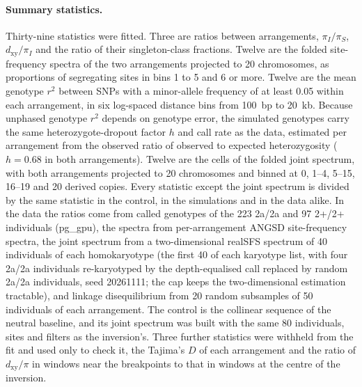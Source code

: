 \documentclass[11pt]{article}
\newcommand{\dxy}{d_\mathrm{xy}}
\begin{document}
\paragraph{Summary statistics.}
Thirty-nine statistics were fitted. Three are ratios between arrangements, $\pi_I/\pi_S$, $\dxy/\pi_I$ and the ratio of their singleton-class fractions. Twelve are the folded site-frequency spectra of the two arrangements projected to 20 chromosomes, as proportions of segregating sites in bins 1 to 5 and 6 or more. Twelve are the mean genotype $r^{2}$ between SNPs with a minor-allele frequency of at least 0.05 within each arrangement, in six log-spaced distance bins from 100~bp to 20~kb. Because unphased genotype $r^{2}$ depends on genotype error, the simulated genotypes carry the same heterozygote-dropout factor $h$ and call rate as the data, estimated per arrangement from the observed ratio of observed to expected heterozygosity ($h=0.68$ in both arrangements). Twelve are the cells of the folded joint spectrum, with both arrangements projected to 20 chromosomes and binned at 0, 1--4, 5--15, 16--19 and 20 derived copies. Every statistic except the joint spectrum is divided by the same statistic in the control, in the simulations and in the data alike. In the data the ratios come from called genotypes of the 223 2a/2a and 97 2+/2+ individuals (pg\_gpu), the spectra from per-arrangement ANGSD site-frequency spectra, the joint spectrum from a two-dimensional realSFS spectrum of 40 individuals of each homokaryotype (the first 40 of each karyotype list, with four 2a/2a individuals re-karyotyped by the depth-equalised call replaced by random 2a/2a individuals, seed 20261111; the cap keeps the two-dimensional estimation tractable), and linkage disequilibrium from 20 random subsamples of 50 individuals of each arrangement. The control is the collinear sequence of the neutral baseline, and its joint spectrum was built with the same 80 individuals, sites and filters as the inversion's. Three further statistics were withheld from the fit and used only to check it, the Tajima's $D$ of each arrangement and the ratio of $\dxy/\pi$ in windows near the breakpoints to that in windows at the centre of the inversion.
\end{document}
